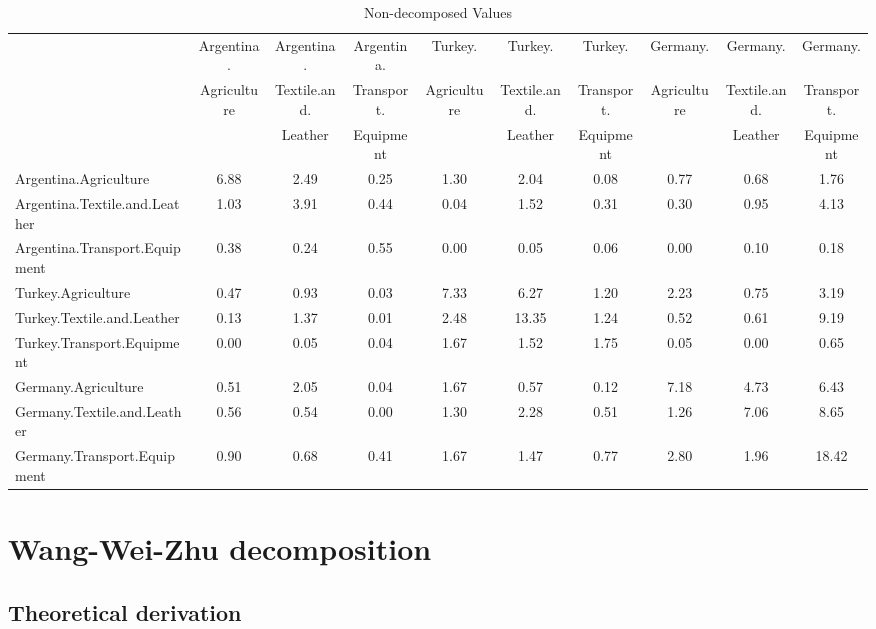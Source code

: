 \documentclass{article}
\begin{document}
\begin{table}[htbp]\scriptsize
    \begin{adjustwidth}{-1.15in}{-1.15in} 
  \centering
  \caption{Non-decomposed Values}
    \begin{tabular}{lccccccccc}
    \toprule
         & Argentina. & Argentina. & Argentina. & Turkey. & Turkey. & Turkey. & Germany. & Germany. & Germany.\\
          & Agriculture & Textile.and. & Transport. & Agriculture & Textile.and. & Transport. & Agriculture & Textile.and. & Transport.\\
          & & Leather & Equipment & & Leather & Equipment & & Leather & Equipment\\
    \midrule
    Argentina.Agriculture & 6.88  & 2.49  & 0.25  & 1.30  & 2.04  & 0.08  & 0.77  & 0.68  & 1.76 \\
    Argentina.Textile.and.Leather & 1.03  & 3.91  & 0.44  & 0.04  & 1.52  & 0.31  & 0.30  & 0.95  & 4.13 \\
    Argentina.Transport.Equipment & 0.38  & 0.24  & 0.55  & 0.00  & 0.05  & 0.06  & 0.00  & 0.10  & 0.18 \\
    Turkey.Agriculture & 0.47  & 0.93  & 0.03  & 7.33  & 6.27  & 1.20  & 2.23  & 0.75  & 3.19 \\
    Turkey.Textile.and.Leather & 0.13  & 1.37  & 0.01  & 2.48  & 13.35 & 1.24  & 0.52  & 0.61  & 9.19 \\
    Turkey.Transport.Equipment & 0.00  & 0.05  & 0.04  & 1.67  & 1.52  & 1.75  & 0.05  & 0.00  & 0.65 \\
    Germany.Agriculture & 0.51  & 2.05  & 0.04  & 1.67  & 0.57  & 0.12  & 7.18  & 4.73  & 6.43 \\
    Germany.Textile.and.Leather & 0.56  & 0.54  & 0.00  & 1.30  & 2.28  & 0.51  & 1.26  & 7.06  & 8.65 \\
    Germany.Transport.Equipment & 0.90  & 0.68  & 0.41  & 1.67  & 1.47  & 0.77  & 2.80  & 1.96  & 18.42 \\
    \bottomrule
    \end{tabular}
  \label{tab:noleon}
        \end{adjustwidth}
\end{table}


\section{Wang-Wei-Zhu decomposition}

\subsection{Theoretical derivation}
\end{document}
